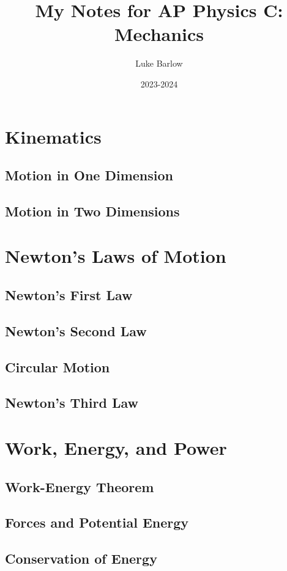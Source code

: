 \documentclass[letterpaper]{report}
\title{My Notes for AP Physics C: Mechanics}
\author{Luke Barlow}
\date{2023-2024}
\begin{document}
\maketitle
\tableofcontents

\chapter{Kinematics}
\section{Motion in One Dimension}
\section{Motion in Two Dimensions}

\chapter{Newton's Laws of Motion}
\section{Newton's First Law}
\section{Newton's Second Law}
\section{Circular Motion}
\section{Newton's Third Law}

\chapter{Work, Energy, and Power}
\section{Work-Energy Theorem}
\section{Forces and Potential Energy}
\section{Conservation of Energy}
\end{document}
